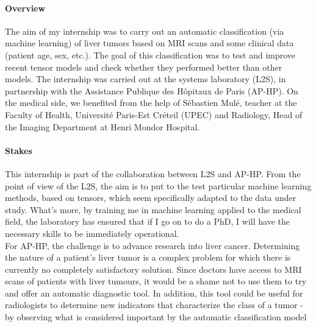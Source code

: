 \documentclass[preprint,12pt]{elsarticle}
\begin{document}
\paragraph*{Overview} The aim of my internship was to carry out an automatic classification (via machine learning) of liver tumors based on MRI scans and some clinical data (patient age, sex, etc.). The goal of this classification was to test and improve recent tensor models \cite{multi_rank_1,multi_rank_r} and check whether they performed better than other models. The internship was carried out at the systems laboratory (L2S), in partnership with the Assistance Publique des Hôpitaux de Paris (AP-HP). On the medical side, we benefited from the help of Sébastien Mulé, teacher at the Faculty of Health, Université Paris-Est Créteil (UPEC) and Radiology, Head of the Imaging Department at Henri Mondor Hospital.

\paragraph*{Stakes} This internship is part of the collaboration between L2S and AP-HP. From the point of view of the L2S, the aim is to put to the test particular machine learning methods, based on tensors, which seem specifically adapted to the data under study. What's more, by training me in machine learning applied to the medical field, the laboratory has ensured that if I go on to do a PhD, I will have the necessary skills to be immediately operational.\\
\indent For AP-HP, the challenge is to advance research into liver cancer. Determining the nature of a patient's liver tumor is a complex problem for which there is currently no completely satisfactory solution. Since doctors have access to MRI scans of patients with liver tumours, it would be a shame not to use them to try and offer an automatic diagnostic tool. In addition, this tool could be useful for radiologists to determine new indicators that characterize the class of a tumor - by observing what is considered important by the automatic classification model
\end{document}
